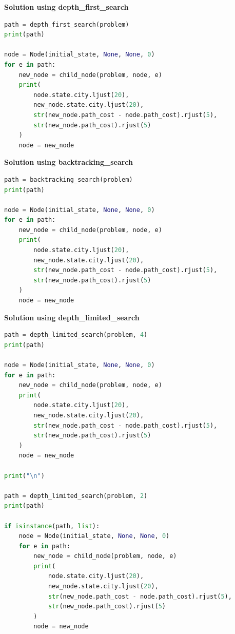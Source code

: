 {\centering \textbf{Solution using depth\_first\_search} \par}

\begin{lstlisting}[language=Python]
path = depth_first_search(problem)
print(path)

node = Node(initial_state, None, None, 0)
for e in path:
    new_node = child_node(problem, node, e)
    print(
        node.state.city.ljust(20), 
        new_node.state.city.ljust(20), 
        str(new_node.path_cost - node.path_cost).rjust(5), 
        str(new_node.path_cost).rjust(5)
    )
    node = new_node
\end{lstlisting}


{\centering \textbf{Solution using backtracking\_search} \par}

\begin{lstlisting}[language=Python]
path = backtracking_search(problem)
print(path)

node = Node(initial_state, None, None, 0)
for e in path:
    new_node = child_node(problem, node, e)
    print(
        node.state.city.ljust(20), 
        new_node.state.city.ljust(20), 
        str(new_node.path_cost - node.path_cost).rjust(5), 
        str(new_node.path_cost).rjust(5)
    )
    node = new_node
\end{lstlisting}



{\centering \textbf{Solution using depth\_limited\_search} \par}

\begin{lstlisting}[language=Python]
path = depth_limited_search(problem, 4)
print(path)

node = Node(initial_state, None, None, 0)
for e in path:
    new_node = child_node(problem, node, e)
    print(
        node.state.city.ljust(20), 
        new_node.state.city.ljust(20), 
        str(new_node.path_cost - node.path_cost).rjust(5), 
        str(new_node.path_cost).rjust(5)
    )
    node = new_node

print("\n")

path = depth_limited_search(problem, 2)
print(path)

if isinstance(path, list):
    node = Node(initial_state, None, None, 0)
    for e in path:
        new_node = child_node(problem, node, e)
        print(
            node.state.city.ljust(20), 
            new_node.state.city.ljust(20), 
            str(new_node.path_cost - node.path_cost).rjust(5), 
            str(new_node.path_cost).rjust(5)
        )
        node = new_node
\end{lstlisting}


